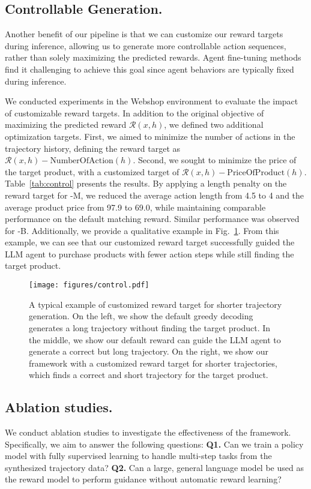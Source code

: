 \subsection{Controllable Generation.}
\label{exp:control}
Another benefit of our \Model pipeline is that we can customize our reward targets during inference, allowing us to generate more controllable action sequences, rather than solely maximizing the predicted rewards. Agent fine-tuning methods~\citep{li2023camel,zeng2023agenttuning} find it challenging to achieve this goal since agent behaviors are typically fixed during inference. 

We conducted experiments in the Webshop environment to evaluate the impact of customizable reward targets. In addition to the original objective of maximizing the predicted reward $\mathcal{R}(x,h)$, we defined two additional optimization targets. First, we aimed to minimize the number of actions in the trajectory history, defining the reward target as $\mathcal{R}(x,h) - \text{NumberOfAction}(h)$. Second, we sought to minimize the price of the target product, with a customized target of $\mathcal{R}(x,h) - \text{PriceOfProduct}(h)$. 
Table~\ref{tab:control} presents the results. By applying a length penalty on the reward target for \Model-M, we reduced the average action length from 4.5 to 4 and the average product price from 97.9 to 69.0, while maintaining comparable performance on the default matching reward. Similar performance was observed for \Model-B. Additionally, we provide a qualitative example in Fig.~\ref{fig:control}. From this example, we can see that our customized reward target successfully guided the LLM agent to purchase products with fewer action steps while still finding the target product.

\begin{figure}[t]  
   \centering
   \texttt{[image: figures/control.pdf]}  
   \caption{A typical example of customized reward target for shorter trajectory generation. On the left, we show the default greedy decoding generates a long trajectory without finding the target product. In the middle, we show our default reward can guide the LLM agent to generate a correct but long trajectory. On the right, we show our framework with a customized reward target for shorter trajectories, which finds a correct and short trajectory for the target product.}  
   \label{fig:control}  
\end{figure}


\subsection{Ablation studies.}
\label{exp:abs}
We conduct ablation studies to investigate the effectiveness of the framework. Specifically, we aim to answer the following questions: 
\textbf{Q1.} Can we train a policy model with fully supervised learning to handle multi-step tasks from the synthesized trajectory data? 
\textbf{Q2.} Can a large, general language model be used as the reward model to perform guidance without automatic reward learning?

